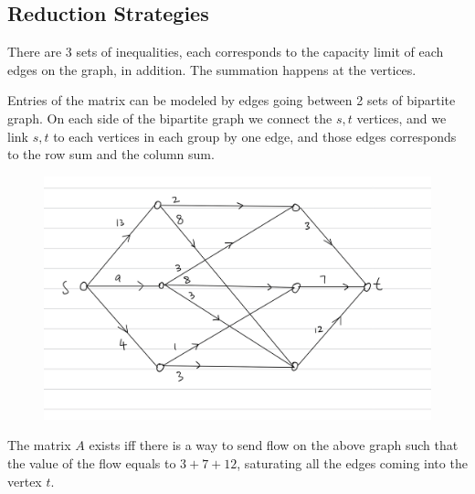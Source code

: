 \documentclass[]{article}
\theoremstyle{definition}
\begin{document}
    \subsection{Reduction Strategies}
        There are 3 sets of inequalities, each corresponds to the capacity limit of each edges on the graph, in addition. The summation happens at the vertices. 
        \par
        Entries of the matrix can be modeled by edges going between 2 sets of bipartite graph. On each side of the bipartite graph we connect the $s, t$ vertices, and we link $s, t$ to each vertices in each group by one edge, and those edges corresponds to the row sum and the column sum. 
        \begin{figure}[h]
            \centering
            \includegraphics[width=14cm]{reduced_graph.jpeg}
        \end{figure}
        The matrix $A$ exists iff there is a way to send flow on the above graph such that the value of the flow equals to $3 + 7 + 12$, saturating all the edges coming into the vertex $t$. 
    \newpage
\end{document}
